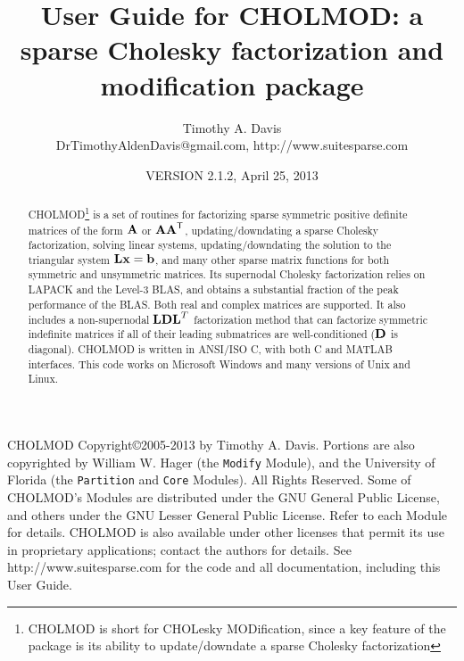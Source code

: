 \documentclass[11pt]{article}
\newcommand{\m}[1]{{\bf{#1}}}       %
\newcommand{\tr}{^{\sf T}}          %
\begin{document}
\author{Timothy A. Davis \\
DrTimothyAldenDavis@gmail.com, http://www.suitesparse.com }
\title{User Guide for CHOLMOD: a sparse Cholesky factorization and
modification package}

\date{VERSION 2.1.2, April 25, 2013}
\maketitle

\begin{abstract}
    CHOLMOD\footnote{CHOLMOD is short for CHOLesky MODification,
    since a key feature of the package is its ability to update/downdate
    a sparse Cholesky factorization}
    is a set of routines for factorizing sparse symmetric positive
    definite matrices of the form $\m{A}$ or $\m{AA}\tr$, updating/downdating
    a sparse Cholesky factorization, solving linear systems, updating/downdating
    the solution to the triangular system $\m{Lx}=\m{b}$, and many other sparse
    matrix functions for both symmetric and unsymmetric matrices.
    Its supernodal Cholesky factorization
    relies on LAPACK and the Level-3 BLAS, and obtains a substantial fraction
    of the peak performance of the BLAS.  Both real and complex matrices
    are supported.  
    It also includes a non-supernodal $\m{LDL}^T$ factorization method
    that can factorize symmetric indefinite matrices if all of their
    leading submatrices are well-conditioned ($\m{D}$ is diagonal).
    CHOLMOD is written in ANSI/ISO C, with both
    C and MATLAB interfaces.  This code works on Microsoft Windows and many versions
    of Unix and Linux.
\end{abstract}

CHOLMOD Copyright\copyright 2005-2013 by Timothy A. Davis.  Portions are also
copyrighted by William W. Hager (the {\tt Modify} Module),
and the University of Florida (the {\tt Partition} and {\tt Core} Modules).
All Rights Reserved.  Some of CHOLMOD's Modules are distributed under the GNU
General Public License, and others under the GNU Lesser General Public License.
Refer to each Module for details.
CHOLMOD is also available under other licenses that permit its use in
proprietary applications; contact the authors for details.
See http://www.suitesparse.com for the code and all documentation,
including this User Guide.
\end{document}
